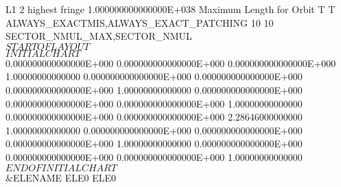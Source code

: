 {{ 
\begin{ptccode}
L1                                                                                                                      
           2  highest fringe   \label{lin:mu:quad}
  1.000000000000000E+038  Maximum Length for Orbit 
 T T ALWAYS_EXACTMIS,ALWAYS_EXACT_PATCHING  \label{lin:mu:mis}
          10          10  SECTOR_NMUL_MAX,SECTOR_NMUL  \label{lin:mu:sect}
  $$$$$$$$$$$$$$$$$ START OF LAYOUT $$$$$$$$$$$$$$$$$
  $$$$$$$$$$$$$$$$$ INITIAL CHART $$$$$$$$$$$$$$$$$
  0.000000000000000E+000  0.000000000000000E+000  0.000000000000000E+000
   1.00000000000000       0.000000000000000E+000  0.000000000000000E+000
  0.000000000000000E+000   1.00000000000000       0.000000000000000E+000
  0.000000000000000E+000  0.000000000000000E+000   1.00000000000000     
  0.000000000000000E+000  0.000000000000000E+000   2.28646000000000     
   1.00000000000000       0.000000000000000E+000  0.000000000000000E+000
  0.000000000000000E+000   1.00000000000000       0.000000000000000E+000
  0.000000000000000E+000  0.000000000000000E+000   1.00000000000000     
  $$$$$$$$$$$$$$$$$ END OF INITIAL CHART $$$$$$$$$$$$$$$$$   \label{lin:mu:chart}
 &ELENAME
 ELE0%
 ELE0%
\end{ptccode}

}}
